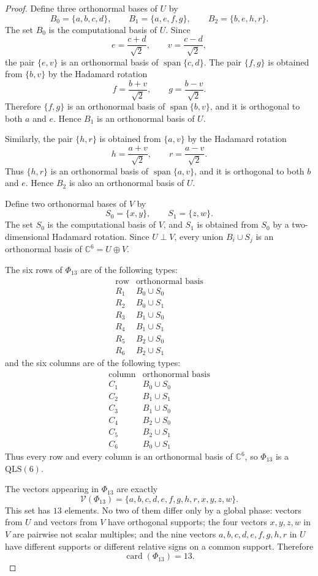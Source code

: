 \documentclass[10pt,a4paper]{amsart}
\newcommand{\C}{\mathbb{C}}
\newcommand{\QLS}{\mathrm{QLS}}
\newcommand{\card}{\operatorname{card}}
\newcommand{\vectset}{\mathcal{V}}
\begin{document}
\begin{proof}
Define three orthonormal bases of $U$ by
\[
  B_0=\{a,b,c,d\},
  \qquad
  B_1=\{a,e,f,g\},
  \qquad
  B_2=\{b,e,h,r\}.
\]
The set $B_0$ is the computational basis of $U$. Since
\[
  e=\frac{c+d}{\sqrt2},
  \qquad
  v=\frac{c-d}{\sqrt2},
\]
the pair $\{e,v\}$ is an orthonormal basis of $\operatorname{span}\{c,d\}$.
The pair $\{f,g\}$ is obtained from $\{b,v\}$ by the Hadamard rotation
\[
  f=\frac{b+v}{\sqrt2},
  \qquad
  g=\frac{b-v}{\sqrt2}.
\]
Therefore $\{f,g\}$ is an orthonormal basis of $\operatorname{span}\{b,v\}$,
and it is orthogonal to both $a$ and $e$. Hence $B_1$ is an orthonormal basis of
$U$.

Similarly, the pair $\{h,r\}$ is obtained from $\{a,v\}$ by the Hadamard
rotation
\[
  h=\frac{a+v}{\sqrt2},
  \qquad
  r=\frac{a-v}{\sqrt2}.
\]
Thus $\{h,r\}$ is an orthonormal basis of $\operatorname{span}\{a,v\}$, and it
is orthogonal to both $b$ and $e$. Hence $B_2$ is also an orthonormal basis of
$U$.

Define two orthonormal bases of $V$ by
\[
  S_0=\{x,y\},
  \qquad
  S_1=\{z,w\}.
\]
The set $S_0$ is the computational basis of $V$, and $S_1$ is obtained from
$S_0$ by a two-dimensional Hadamard rotation. Since $U\perp V$, every union
$B_i\cup S_j$ is an orthonormal basis of $\C^6=U\oplus V$.

The six rows of $\Phi_{13}$ are of the following types:
\[
\begin{array}{c|c}
\text{row} & \text{orthonormal basis} \\\hline
R_1 & B_0\cup S_0\\
R_2 & B_0\cup S_1\\
R_3 & B_1\cup S_0\\
R_4 & B_1\cup S_1\\
R_5 & B_2\cup S_0\\
R_6 & B_2\cup S_1
\end{array}
\]
and the six columns are of the following types:
\[
\begin{array}{c|c}
\text{column} & \text{orthonormal basis} \\\hline
C_1 & B_0\cup S_0\\
C_2 & B_1\cup S_1\\
C_3 & B_1\cup S_0\\
C_4 & B_2\cup S_0\\
C_5 & B_2\cup S_1\\
C_6 & B_0\cup S_1
\end{array}
\]
Thus every row and every column is an orthonormal basis of $\C^6$, so
$\Phi_{13}$ is a $\QLS(6)$.

The vectors appearing in $\Phi_{13}$ are exactly
\[
  \vectset(\Phi_{13})=\{a,b,c,d,e,f,g,h,r,x,y,z,w\}.
\]
This set has $13$ elements. No two of them differ only by a global phase:
vectors from $U$ and vectors from $V$ have orthogonal supports; the four vectors
$x,y,z,w$ in $V$ are pairwise not scalar multiples; and the nine vectors
$a,b,c,d,e,f,g,h,r$ in $U$ have different supports or different relative signs
on a common support. Therefore
\[
  \card(\Phi_{13})=13.
\]
\end{proof}
\end{document}
